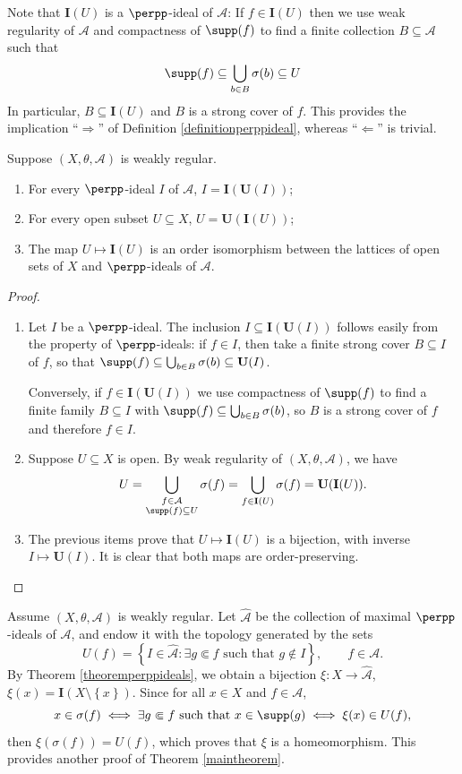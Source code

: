 Note that $\mathbf{I}(U)$ is a $\perpp$-ideal of $\mathcal{A}$: If $f\in\mathbf{I}(U)$ then we use weak regularity of $\mathcal{A}$ and compactness of $\supp(f)$ to find a finite collection $B\subseteq\mathcal{A}$ such that
\[\supp(f)\subseteq\bigcup_{b\in B}\sigma(b)\subseteq U\]
In particular, $B\subseteq\mathbf{I}(U)$ and $B$ is a strong cover of $f$. This provides the implication ``$\Rightarrow$'' of Definition \ref{definitionperppideal}, whereas ``$\Leftarrow$'' is trivial.

\begin{theorem}\label{theoremperppideals}
Suppose $(X,\theta,\mathcal{A})$ is weakly regular.
\begin{enumerate}
\item[(a)] For every $\perpp$-ideal $I$ of $\mathcal{A}$, $I=\mathbf{I}(\mathbf{U}(I))$;
\item[(b)] For every open subset $U\subseteq X$, $U=\mathbf{U}(\mathbf{I}(U))$;
\item[(c)] The map $U\mapsto\mathbf{I}(U)$ is an order isomorphism between the lattices of open sets of $X$ and $\perpp$-ideals of $\mathcal{A}$.
\end{enumerate}
\end{theorem}
\begin{proof}
\begin{enumerate}
\item[(a)] Let $I$ be a $\perpp$-ideal. The inclusion $I\subseteq \mathbf{I}(\mathbf{U}(I))$ follows easily from the property of $\perpp$-ideals: if $f\in I$, then take a finite strong cover $B\subseteq I$ of $f$, so that $\supp(f)\subseteq\bigcup_{b\in B}\sigma(b)\subseteq\mathbf{U}(I)$.

Conversely, if $f\in\mathbf{I}(\mathbf{U}(I))$ we use compactness of $\supp(f)$ to find a finite family $B\subseteq I$ with $\supp(f)\subseteq\bigcup_{b\in B}\sigma(b)$, so $B$ is a strong cover of $f$ and therefore $f\in I$.
\item[(b)] Suppose $U\subseteq X$ is open. By weak regularity of $(X,\theta,\mathcal{A})$, we have
\[U=\bigcup_{\substack{f\in\mathcal{A}\\\supp(f)\subseteq U}}\sigma(f)=\bigcup_{f\in\mathbf{I}(U)}\sigma(f)=\mathbf{U}(\mathbf{I}(U)).\]
\item[(c)] The previous items prove that $U\mapsto\mathbf{I}(U)$ is a bijection, with inverse $I\mapsto\mathbf{U}(I)$. It is clear that both maps are order-preserving.\qedhere
\end{enumerate}
\end{proof}

Assume $(X,\theta,\mathcal{A})$ is weakly regular. Let $\widehat{\mathcal{A}}$ be the collection of maximal $\perpp$-ideals of $\mathcal{A}$, and endow it with the topology generated by the sets
\[U(f)=\left\{I\in\widehat{\mathcal{A}}:\exists g\Subset f\text{ such that }g\not\in I\right\},\qquad f\in\mathcal{A}.\]
By Theorem \ref{theoremperppideals}, we obtain a bijection $\xi:X\to\widehat{\mathcal{A}}$, $\xi(x)=\mathbf{I}(X\setminus\left\{x\right\})$. Since for all $x\in X$ and $f\in\mathcal{A}$,
\[x\in\sigma(f)\iff\exists g\Subset f\text{ such that } x\in\supp(g)\iff\xi(x)\in U(f),\]
then $\xi(\sigma(f))=U(f)$, which proves that $\xi$ is a homeomorphism. This provides another proof of Theorem \ref{maintheorem}.